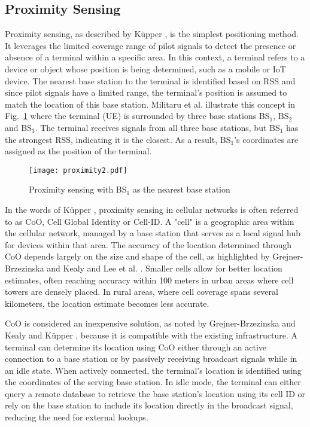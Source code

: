 \subsection{Proximity Sensing}
Proximity sensing, as described by K\"upper \cite{kupper2005location}, is the simplest positioning method.
It leverages the limited coverage range of pilot signals to detect the presence or absence of a terminal within a specific area.
In this context, a terminal refers to a device or object whose position is being determined, such as a mobile or \ac{IoT} device.
The nearest base station to the terminal is identified based on \ac{RSS} and since pilot signals have a limited range, the terminal's position is assumed to match the location of this base station.
Militaru et al. \cite{militaru2024positioning} illustrate this concept in Fig.~\ref{fig:proximity2} where the terminal (UE) is surrounded by three base stations BS$_1$, BS$_2$ and BS$_3$. 
The terminal receives signals from all three base stations, but BS$_1$ has the strongest \acs{RSS}, indicating it is the closest. 
As a result, BS$_1$'s coordinates are assigned as the position of the terminal.

\begin{figure}[htbp]
    \centering
    \texttt{[image: proximity2.pdf]}
    \caption{Proximity sensing with BS$_1$ as the nearest base station \cite{militaru2024positioning}}
    \label{fig:proximity2}
\end{figure}

In the words of K\"upper \cite{kupper2005location}, proximity sensing in cellular networks is often referred to as \ac{CoO}, Cell Global Identity or Cell-ID. 
A "cell" is a geographic area within the cellular network, managed by a base station that serves as a local signal hub for devices within that area. 
The accuracy of the location determined through \acs{CoO} depends largely on the size and shape of the cell, as highlighted by Grejner-Brzezinska and Kealy \cite{grejner2004positioning} and Lee et al. \cite{lee2014localization}.
Smaller cells allow for better location estimates, often reaching accuracy within 100 meters in urban areas where cell towers are densely placed.
In rural areas, where cell coverage spans several kilometers, the location estimate becomes less accurate.

\acs{CoO} is considered an inexpensive solution, as noted by Grejner-Brzezinska and Kealy \cite{grejner2004positioning} and K\"upper \cite{kupper2005location}, because it is compatible with the existing infrastructure. 
A terminal can determine its location using \acs{CoO} either through an active connection to a base station or by passively receiving broadcast signals while in an idle state. 
When actively connected, the terminal's location is identified using the coordinates of the serving base station. 
In idle mode, the terminal can either query a remote database to retrieve the base station's location using its cell ID or rely on the base station to include its location directly in the broadcast signal, reducing the need for external lookups. 

